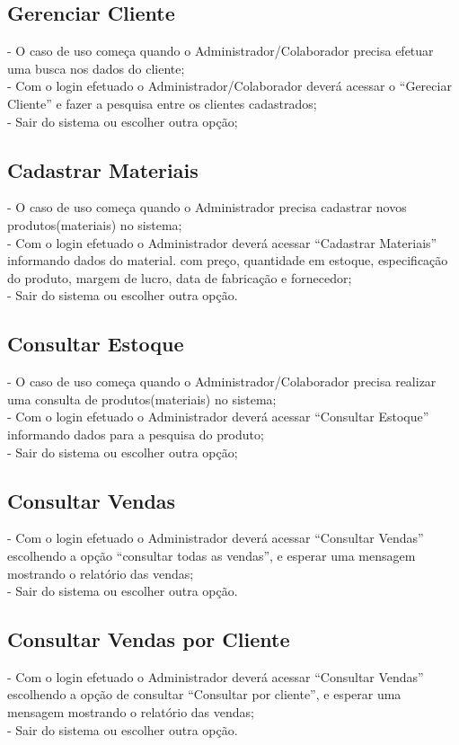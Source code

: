 \documentclass[12pt]{report}
\begin{document}
\subsection{Gerenciar Cliente}
- O caso de uso começa quando o Administrador/Colaborador precisa efetuar uma
busca nos dados do cliente;\\
- Com o login efetuado o Administrador/Colaborador deverá acessar o “Gereciar
Cliente” e fazer a pesquisa entre os clientes cadastrados;\\
- Sair do sistema ou escolher outra opção;\\

\subsection{Cadastrar Materiais}
- O caso de uso começa quando o Administrador precisa cadastrar novos
produtos(materiais) no sistema;\\
- Com o login efetuado o Administrador deverá acessar “Cadastrar Materiais”
informando dados do material.  com preço, quantidade em estoque, especificação
do produto, margem de lucro, data de fabricação e fornecedor;\\
- Sair do sistema ou escolher outra opção.\\

\subsection{Consultar Estoque}
- O caso de uso começa quando o Administrador/Colaborador precisa realizar uma
consulta de produtos(materiais) no sistema;\\
- Com o login efetuado o Administrador deverá acessar “Consultar Estoque”
informando dados para a pesquisa do produto;\\
- Sair do sistema ou escolher outra opção;\\

\subsection{Consultar Vendas}
- Com o login efetuado o Administrador deverá acessar “Consultar Vendas” escolhendo
a opção “consultar todas as vendas”, e esperar uma mensagem mostrando o relatório das vendas;\\
- Sair do sistema ou escolher outra opção.\\


\subsection{Consultar Vendas por Cliente}
- Com o login efetuado o Administrador deverá acessar “Consultar Vendas”
escolhendo a opção de consultar “Consultar por cliente”, e esperar uma mensagem 
mostrando o relatório das vendas;\\
- Sair do sistema ou escolher outra opção.\\
\end{document}
